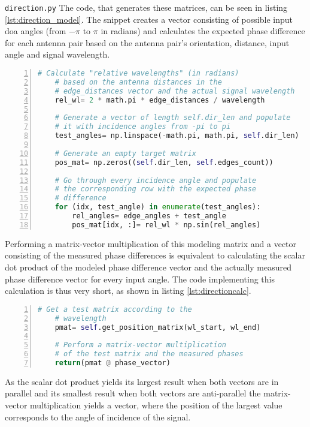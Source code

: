 \begin{subchapter}{\texttt{direction.py}}
  The code, that generates these matrices, can be seen in
  listing \ref{lst:direction_model}.
  The snippet creates a vector consisting of possible input
  \acrlong{doa} angles (from $-\pi$ to $\pi$ in radians)
  and calculates the expected phase difference for each
  antenna pair based on the antenna pair's orientation,
  distance, input angle and signal wavelength.

  \begin{lstlisting}[language=Python, frame=single,
      numbers=left, label={lst:direction_model},
      caption={Code fragment that calculates the receiver model}]
    # Calculate "relative wavelengths" (in radians)
    # based on the antenna distances in the
    # edge_distances vector and the actual signal wavelength
    rel_wl= 2 * math.pi * edge_distances / wavelength

    # Generate a vector of length self.dir_len and populate
    # it with incidence angles from -pi to pi
    test_angles= np.linspace(-math.pi, math.pi, self.dir_len)

    # Generate an empty target matrix
    pos_mat= np.zeros((self.dir_len, self.edges_count))

    # Go through every incidence angle and populate
    # the corresponding row with the expected phase
    # difference
    for (idx, test_angle) in enumerate(test_angles):
        rel_angles= edge_angles + test_angle
        pos_mat[idx, :]= rel_wl * np.sin(rel_angles)
  \end{lstlisting}

  \newpage
  
  Performing a matrix-vector multiplication of this modeling matrix
  and a vector consisting of the measured phase differences
  is equivalent to calculating the scalar dot product of the
  modeled phase difference vector and the actually measured
  phase difference vector for every input angle.
  The code implementing this calculation is
  thus very short, as shown in listing \ref{lst:directioncalc}. \\

  \begin{lstlisting}[language=Python, frame=single,
      numbers=left, label={lst:directioncalc},
      caption={Code fragment that calculates the \gls{doa} estimation}]
    # Get a test matrix according to the
    # wavelength
    pmat= self.get_position_matrix(wl_start, wl_end)

    # Perform a matrix-vector multiplication
    # of the test matrix and the measured phases
    return(pmat @ phase_vector)
  \end{lstlisting}

  As the scalar dot product yields its largest result
  when both vectors are in parallel and its smallest
  result when both vectors are anti-parallel the
  matrix-vector multiplication yields a vector, where
  the position of the largest value corresponds to the
  angle of incidence of the signal.
\end{subchapter}

